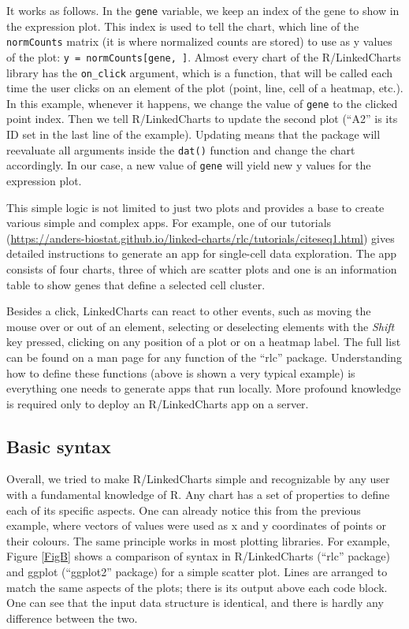 \documentclass[twocolumn,10pt]{article}
\begin{document}
It works as follows. In the \texttt{gene} variable, we keep an index of the gene to show in the expression plot. This index is used to tell the chart, which line of the \texttt{normCounts} matrix (it is where normalized counts are stored) to use as y values of the plot: \texttt{y = normCounts[gene, ]}. Almost every chart of the R/LinkedCharts library has the \texttt{on_click} argument, which is a function, that will be called each time the user clicks on an element of the plot (point, line, cell of a heatmap, etc.). In this example, whenever it happens, we change the value of \texttt{gene} to the clicked point index. Then we tell R/LinkedCharts to update the second plot (``A2'' is its ID set in the last line of the example). Updating means that the package will reevaluate all arguments inside the \texttt{dat()} function and change the chart accordingly. In our case, a new value of \texttt{gene} will yield new y values for the expression plot.

This simple logic is not limited to just two plots and provides a base to create various simple and complex apps. For example, one of our tutorials (\url{https://anders-biostat.github.io/linked-charts/rlc/tutorials/citeseq1.html}) gives detailed instructions to generate an app for single-cell data exploration. The app consists of four charts, three of which are scatter plots and one is an information table to show genes that define a selected cell cluster.

Besides a click, LinkedCharts can react to other events, such as moving the mouse over or out of an element, selecting or deselecting elements with the \emph{Shift} key pressed, clicking on any position of a plot or on a heatmap label. The full list can be found on a man page for any function of the ``rlc'' package. Understanding how to define these functions (above is shown a very typical example) is everything one needs to generate apps that run locally. More profound knowledge is required only to deploy an R/LinkedCharts app on a server. 

\subsection{Basic syntax}

Overall, we tried to make R/LinkedCharts simple and recognizable by any user with a fundamental knowledge of R. Any chart has a set of properties to define each of its specific aspects. One can already notice this from the previous example, where vectors of values were used as x and y coordinates of points or their colours. The same principle works in most plotting libraries. For example, Figure \ref{FigB} shows a comparison of syntax in R/LinkedCharts (``rlc'' package) and ggplot (``ggplot2'' \citep{wickham_2016} package) for a simple scatter plot. Lines are arranged to match the same aspects of the plots; there is its output above each code block. One can see that the input data structure is identical, and there is hardly any difference between the two.
\end{document}
